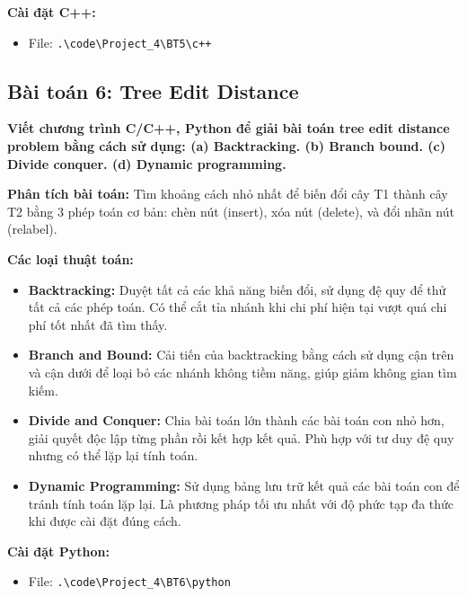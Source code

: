 \documentclass[12pt,a4paper]{article}
\begin{document}
\textbf{Cài đặt C++:}
\begin{itemize}[label=\textbullet]
    \item File: \texttt{.\textbackslash code\textbackslash Project\_4\textbackslash BT5\textbackslash c++}
\end{itemize}

\subsection{Bài toán 6: Tree Edit Distance}

\begin{problembox}
    \textbf{Viết chương trình C/C++, Python để giải bài toán tree edit distance problem bằng cách sử dụng: (a) Backtracking. (b) Branch bound. (c) Divide conquer. (d) Dynamic programming.} 

\end{problembox}

\textbf{Phân tích bài toán:} Tìm khoảng cách nhỏ nhất để biến đổi cây T1 thành cây T2 bằng 3 phép toán cơ bản: chèn nút (insert), xóa nút (delete), và đổi nhãn nút (relabel).

\vspace{0.5cm}
\textbf{Các loại thuật toán: }

\begin{itemize}[label=\textbullet]
    \item \textbf{Backtracking:} Duyệt tất cả các khả năng biến đổi, sử dụng đệ quy để thử tất cả các phép toán. Có thể cắt tỉa nhánh khi chi phí hiện tại vượt quá chi phí tốt nhất đã tìm thấy.
    \item \textbf{Branch and Bound:} Cải tiến của backtracking bằng cách sử dụng cận trên và cận dưới để loại bỏ các nhánh không tiềm năng, giúp giảm không gian tìm kiếm.
    \item \textbf{Divide and Conquer:} Chia bài toán lớn thành các bài toán con nhỏ hơn, giải quyết độc lập từng phần rồi kết hợp kết quả. Phù hợp với tư duy đệ quy nhưng có thể lặp lại tính toán. 
    \item \textbf{Dynamic Programming:} Sử dụng bảng lưu trữ kết quả các bài toán con để tránh tính toán lặp lại. Là phương pháp tối ưu nhất với độ phức tạp đa thức khi được cài đặt đúng cách. 
\end{itemize}


\textbf{Cài đặt Python:}
\begin{itemize}[label=\textbullet]
    \item File: \texttt{.\textbackslash code\textbackslash Project\_4\textbackslash BT6\textbackslash python}
\end{itemize}
\end{document}

